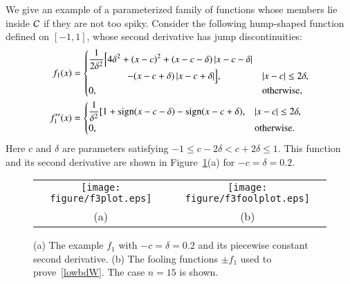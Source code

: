 \documentclass[review]{elsarticle}
\theoremstyle{definition}
\begin{document}
We give an example of a parameterized family of functions whose members lie
inside $\mathcal{C}$ if they are not too spiky.
Consider the following hump-shaped function defined on $[-1,1]$, whose
second derivative has jump discontinuities:
\begin{align} \label{f3def}
f_1(x) & = \begin{cases} \displaystyle
   \frac{1}{2\delta^2} \Bigl [4 \delta^2 + (x-c)^2 + (x-c-\delta)\left \lvert x-c-\delta \right \rvert
\\ \qquad \qquad
    - (x-c+\delta)\left \lvert x-c+\delta \right \rvert \Bigr ], & \left \lvert x-c \right \rvert \le 2\delta,
\\ 0, & \text{otherwise},
\end{cases}
\\ \nonumber
f''_1(x) & =
\begin{cases} \displaystyle
    \frac{1}{\delta^2} [1 + \operatorname{sign}(x-c-\delta) - \operatorname{sign}(x-c+\delta), & \left \lvert x-c \right \rvert \le 2\delta,
\\ 0, & \text{otherwise}.
\end{cases}
\end{align}
Here $c$ and $\delta$ are parameters satisfying $-1 \le c-2 \delta < c+ 2\delta
\le 1$. This function and its second derivative are shown in Figure~\ref{f3fig}(a)
for $-c=\delta = 0.2$.


\begin{figure}[tb]
\centering
\begin{tabular}{cc}
\texttt{[image: figure/f3plot.eps]}
& \texttt{[image: figure/f3foolplot.eps]}
\\[1ex] (a) & (b)
\end{tabular}
\caption{(a) The example $f_1$ with $-c=\delta = 0.2$ and its piecewise constant
second derivative.
(b) The fooling functions $\pm f_1$ used to prove~\eqref{lowbdW}. The case
$n=15$ is shown. \label{f3fig}}
\end{figure}
\end{document}

